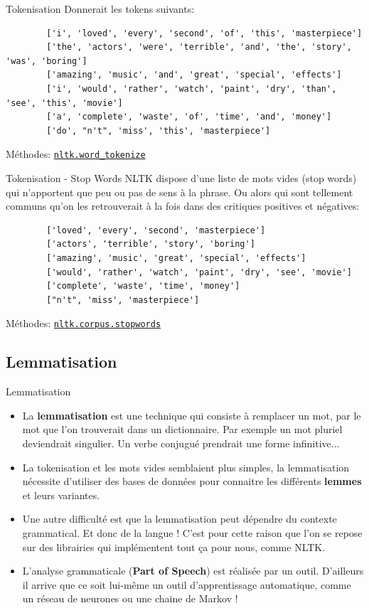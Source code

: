 \begin{frame}[fragile]{Tokenisation}
	Donnerait les tokens suivants:
	\begin{lstlisting}
		['i', 'loved', 'every', 'second', 'of', 'this', 'masterpiece']
		['the', 'actors', 'were', 'terrible', 'and', 'the', 'story', 'was', 'boring']
		['amazing', 'music', 'and', 'great', 'special', 'effects']
		['i', 'would', 'rather', 'watch', 'paint', 'dry', 'than', 'see', 'this', 'movie']
		['a', 'complete', 'waste', 'of', 'time', 'and', 'money']
		['do', "n't", 'miss', 'this', 'masterpiece']
	\end{lstlisting}
	\vfill
	Méthodes: \href{https://www.nltk.org/api/nltk.tokenize.html\#nltk-tokenize-package}{\texttt{nltk.word\_tokenize}}
\end{frame}

\begin{frame}[fragile]{Tokenisation - Stop Words}
	NLTK dispose d'une liste de mots vides (stop words) qui n'apportent que peu ou pas de sens à la phrase. Ou alors qui sont tellement communs qu'on les retrouverait à la fois dans des critiques positives et négatives:
	\begin{lstlisting}
		['loved', 'every', 'second', 'masterpiece']
		['actors', 'terrible', 'story', 'boring']
		['amazing', 'music', 'great', 'special', 'effects']
		['would', 'rather', 'watch', 'paint', 'dry', 'see', 'movie']
		['complete', 'waste', 'time', 'money']
		["n't", 'miss', 'masterpiece']
	\end{lstlisting}
	\vfill
	Méthodes: \href{https://www.nltk.org/howto/corpus.html\#word-lists-and-lexicons}{\texttt{nltk.corpus.stopwords}}
\end{frame}

\subsection[Lemmatisation]{Lemmatisation}

\begin{frame}[fragile]{Lemmatisation}
	\begin{itemize}
		\item La \textbf{lemmatisation} est une technique qui consiste à remplacer un mot, par le mot que l'on trouverait dans un dictionnaire. Par exemple un mot pluriel deviendrait singulier. Un verbe conjugué prendrait une forme infinitive...
		\pause
		\item La tokenisation et les mots vides semblaient plus simples, la lemmatisation nécessite d'utiliser des bases de données pour connaitre les différents \textbf{lemmes} et leurs variantes.
		\pause
		\item Une autre difficulté est que la lemmatisation peut dépendre du contexte grammatical. Et donc de la langue ! C'est pour cette raison que l'on se repose sur des librairies qui implémentent tout ça pour nous, comme NLTK.
		\pause
		\item L'analyse grammaticale (\textbf{Part of Speech}) est réalisée par un outil. D'ailleurs il arrive que ce soit lui-même un outil d'apprentissage automatique, comme un réseau de neurones ou une chaine de Markov !
	\end{itemize}
\end{frame}

